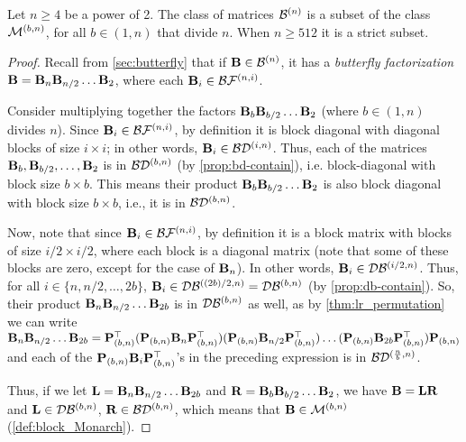 \begin{theorem}
\label{thm:b_contained}
Let $n \ge 4$ be a power of 2. The class of matrices $\mathcal{B}^{(n)}$ is a subset of the class $\mathcal{M}^{(b, n)}$, for all $b \in (1, n)$ that divide $n$. When $n \ge 512$ it is a strict subset.
\end{theorem}
\begin{proof}
Recall from \cref{sec:butterfly} that if $\mathbf{B} \in \mathcal{B}^{(n)}$, it has a \emph{butterfly factorization} 
$\mathbf{B} = \mathbf{B}_n \mathbf{B}_{n/2} \hdots \mathbf{B}_2$, where each $\mathbf{B}_i \in \mathcal{B}\mathcal{F}^{(n, i)}$.

Consider multiplying together the factors $\mathbf{B}_b \mathbf{B}_{b/2} \dots \mathbf{B}_2$ (where $b \in (1, n)$ divides $n$). Since $\mathbf{B}_i \in \mathcal{B}\mathcal{F}^{(n,i)}$, by definition it is block diagonal with diagonal blocks of size $i \times i$; in other words, $\mathbf{B}_i \in \mathcal{B}\mathcal{D}^{(i, n)}$. Thus, each of the matrices $\mathbf{B}_b, \mathbf{B}_{b/2}, \dots, \mathbf{B}_2$ is in $\mathcal{B}\mathcal{D}^{(b, n)}$ (by \cref{prop:bd-contain}), i.e. block-diagonal with block size $b \times b$. This means their product $\mathbf{B}_b \mathbf{B}_{b/2} \dots \mathbf{B}_2$ is also block diagonal with block size $b \times b$, i.e., it is in $\mathcal{B}\mathcal{D}^{(b, n)}$.

Now, note that since $\mathbf{B}_i \in \mathcal{B}\mathcal{F}^{(n,i)}$, by definition it is a block matrix with blocks of size $i/2 \times i/2$, where each block is a diagonal matrix (note that some of these blocks are zero, except for the case of $\mathbf{B}_n$). In other words, $\mathbf{B}_i \in \mathcal{D}\mathcal{B}^{(i/2, n)}$. Thus, for all $i \in \{n, n/2, \dots, 2b\}$, $\mathbf{B}_i \in \mathcal{D}\mathcal{B}^{((2b)/2, n)} = \mathcal{D}\mathcal{B}^{(b, n)}$ (by \cref{prop:db-contain}). So, their product $\mathbf{B}_n \mathbf{B}_{n/2} \dots \mathbf{B}_{2b}$ is in $\mathcal{D}\mathcal{B}^{(b, n)}$ as well, as by \cref{thm:lr_permutation} we can write $\mathbf{B}_n \mathbf{B}_{n/2} \dots \mathbf{B}_{2b} = \mathbf{P}_{(b,n)}^\top (\mathbf{P}_{(b,n)} \mathbf{B}_n \mathbf{P}_{(b,n)}^\top) (\mathbf{P}_{(b,n)} \mathbf{B}_{n/2} \mathbf{P}_{(b,n)}^\top) \dots (\mathbf{P}_{(b,n)} \mathbf{B}_{2b} \mathbf{P}_{(b,n)}^\top) \mathbf{P}_{(b,n)}$ and each of the $\mathbf{P}_{(b,n)} \mathbf{B}_i \mathbf{P}_{(b,n)}^\top$'s in the preceding expression is in $\mathcal{B}\mathcal{D}^{(\frac{n}{b}, n)}$.

Thus, if we let $\mathbf{L} = \mathbf{B}_n \mathbf{B}_{n/2} \dots \mathbf{B}_{2b}$ and $\mathbf{R} = \mathbf{B}_b \mathbf{B}_{b/2} \dots \mathbf{B}_2$,  we have $\mathbf{B} = \mathbf{L}\mathbf{R}$ and $\mathbf{L} \in \mathcal{D}\mathcal{B}^{(b, n)}$, $\mathbf{R} \in \mathcal{B}\mathcal{D}^{(b, n)}$, which means that $\mathbf{B} \in \mathcal{M}^{(b,n)}$ (\cref{def:block_Monarch}).


\end{proof}
